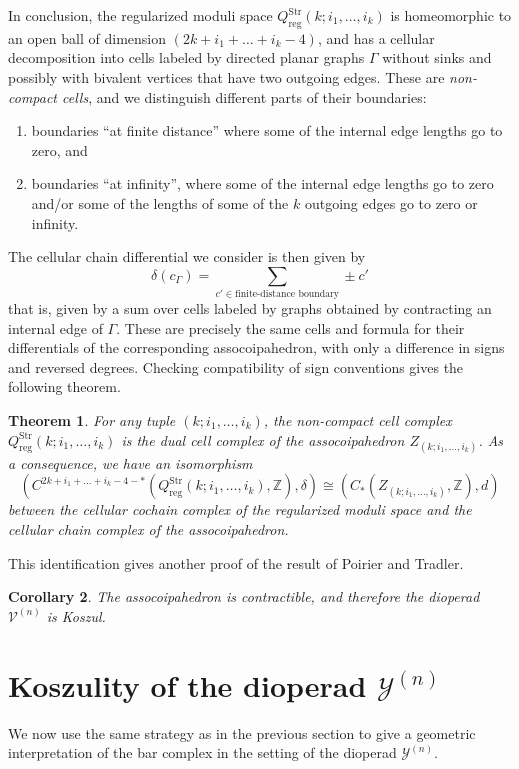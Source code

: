 \documentclass[11pt,a4paper]{amsart}
\newcommand{\ZZ}{\ensuremath{\mathbb{Z}}}
\newcommand{\scrY}{\mathscr{Y}}
\newcommand{\scrV}{\mathscr{V}}
\newtheorem{theorem}{Theorem}
\newtheorem{corollary}[theorem]{Corollary}
\theoremstyle{definition}
\begin{document}
In conclusion, the regularized moduli space $Q^\mathrm{Str}_\mathrm{reg}(k;i_1,\dots,i_k)$ is homeomorphic to an open ball of dimension $(2k + i_1 + \dots + i_k -4)$, and has a cellular decomposition into cells labeled by directed planar graphs $\Gamma$ without sinks and possibly with bivalent vertices that have two outgoing edges. These are \textit{non-compact cells}, and we distinguish different parts of their boundaries:
\begin{enumerate}
    \item boundaries ``at finite distance'' where some of the internal edge lengths go to zero, and
    \item boundaries ``at infinity'', where some of the internal edge lengths go to zero and/or some of the lengths of some of the $k$ outgoing edges go to zero or infinity.
\end{enumerate}
The cellular chain differential we consider is then given by
\[ \delta(c_\Gamma) = \sum_{c' \in \text{finite-distance boundary}} \pm c' \] 
that is, given by a sum over cells labeled by graphs obtained by contracting an internal edge of $\Gamma$. These are precisely the same cells and formula for their differentials of the corresponding assocoipahedron, with only a difference in signs and reversed degrees. Checking compatibility of sign conventions gives the following theorem.
\begin{theorem}
    For any tuple $(k;i_1,\dots,i_k)$, the non-compact cell complex $Q^\mathrm{Str}_\mathrm{reg}(k;i_1,\dots,i_k)$ is the dual cell complex of the assocoipahedron $Z_{(k;i_1,\dots,i_k)}$. As a consequence, we have an isomorphism
    \[ (C^{2k+i_1+\dots+i_k-4-*}(Q^\mathrm{Str}_\mathrm{reg}(k;i_1,\dots,i_k),\ZZ), \delta) \cong (C_*(Z_{(k;i_1,\dots,i_k)},\ZZ),d) \]
    between the cellular cochain complex of the regularized moduli space and the cellular chain complex of the assocoipahedron.
\end{theorem}
\noindent This identification gives another proof of the result of Poirier and Tradler.
\begin{corollary}
    The assocoipahedron is contractible, and therefore the dioperad $\scrV^{(n)}$ is Koszul.
\end{corollary}

\section{Koszulity of the dioperad $\scrY^{(n)}$}\label{KoszulityY}
\noindent We now use the same strategy as in the previous section to give a geometric interpretation of the bar complex in the setting of the dioperad $\scrY^{(n)}$. 
\end{document}
